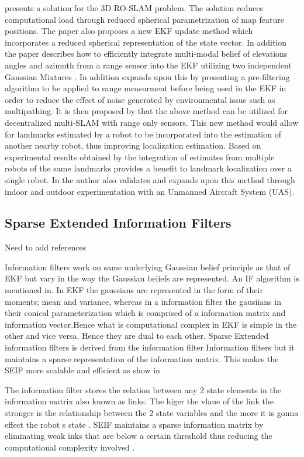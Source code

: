 \documentclass[conference]{IEEEtran}
\begin{document}
	\cite{Fabresse2013} presents a solution for the 3D RO-SLAM problem. The solution reduces computational load through reduced spherical parametrization of map feature positions. The paper also proposes a new EKF update method which incorporates a reduced spherical representation of the state vector. In addition the paper describes how to efficiently integrate multi-modal belief of elevations angles and azimuth from a range sensor into the EKF utilizing two independent Gaussian Mixtures \cite{Fabresse2013}. In addition \cite{Fabresse2014} expands upon this by presenting a pre-filtering algorithm to be applied to range measurment before being used in the EKF in order to reduce the effect of noise generated by environmental issue such as multipathing. It is then proposed by \cite{Fabresse2015} that the above method can be utilized for decentralized multi-SLAM with range only sensors. This new method would allow for landmarks estimated by a robot to be incorporated into the estimation of another nearby robot, thus improving localization estimation. Based on experimental results obtained by \cite{Fabresse2015} the integration of estimates from multiple robots of the same landmarks provides a benefit to landmark localization over a single robot. In \cite{Fabresse2016} the author also validates and expands upon this method through indoor and outdoor experimentation with an Unmanned Aircraft System (UAS).  
	
\subsection{Sparse Extended Information Filters}
Need to add references

Information filters work on same underlying Gaussian belief principle as that of EKF but vary in the way the Gaussian beliefs are represented. An IF algorithm is mentioned in\cite{Torres-Gonzalez2014}. In EKF the gaussians are represented in the form of their moments; mean and variance, whereas in a information filter the gausiians in their conical parameterization which is comprised of a information matrix and information vector.Hence what is computational complex in EKF is simple in the other and vice versa. Hence they are dual to each other.
Sparse Extended information filters is derived from the information filter Information filters but it maintains a sparse representation of the information matrix. This makes the SEIF more scalable and efficient as show in\cite{Torres-Gonzalez2014} 

The information filter stores the relation between any 2 state elements in the information matrix also known as links. The higer the vlaue of the link the stronger is the relationship between the 2 state variables and the more it is gonna effect the robot s state . SEIF maintains a sparse information matrix by eliminating weak inks that are below a certain threshold thus reducing the computational complexity involved .
\end{document}
